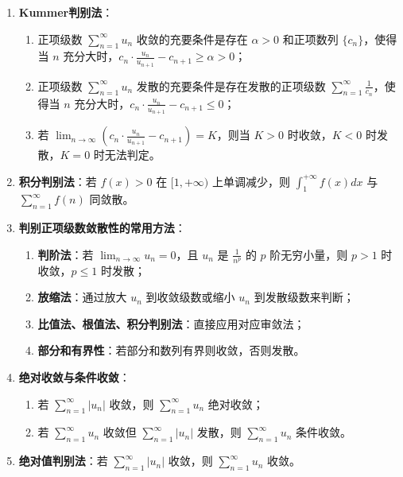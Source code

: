 \documentclass[UTF8]{ctexart}
\theoremstyle{remark}
\begin{document}
\begin{enumerate}
	\item \textbf{Kummer判别法}：
	\begin{enumerate}
		\item 正项级数 \(\sum_{n=1}^{\infty} u_n\) 收敛的充要条件是存在 \(\alpha > 0\) 和正项数列 \(\{c_n\}\)，使得当 \(n\) 充分大时，\(c_n \cdot \frac{u_n}{u_{n+1}} - c_{n+1} \geq \alpha > 0\)；
		\item 正项级数 \(\sum_{n=1}^{\infty} u_n\) 发散的充要条件是存在发散的正项级数 \(\sum_{n=1}^{\infty} \frac{1}{c_n}\)，使得当 \(n\) 充分大时，\(c_n \cdot \frac{u_n}{u_{n+1}} - c_{n+1} \leq 0\)；
		\item 若 \(\lim_{n \to \infty} \left(c_n \cdot \frac{u_n}{u_{n+1}} - c_{n+1}\right) = K\)，则当 \(K > 0\) 时收敛，\(K < 0\) 时发散，\(K = 0\) 时无法判定。
	\end{enumerate}
	
	\item \textbf{积分判别法}：若 \(f(x) > 0\) 在 \([1, +\infty)\) 上单调减少，则 \(\int_{1}^{+\infty} f(x) dx\) 与 \(\sum_{n=1}^{\infty} f(n)\) 同敛散。
	
	\item \textbf{判别正项级数敛散性的常用方法}：
	\begin{enumerate}
		\item \textbf{判阶法}：若 \(\lim_{n \to \infty} u_n = 0\)，且 \(u_n\) 是 \(\frac{1}{n^p}\) 的 \(p\) 阶无穷小量，则 \(p > 1\) 时收敛，\(p \leq 1\) 时发散；
		\item \textbf{放缩法}：通过放大 \(u_n\) 到收敛级数或缩小 \(u_n\) 到发散级数来判断；
		\item \textbf{比值法、根值法、积分判别法}：直接应用对应审敛法；
		\item \textbf{部分和有界性}：若部分和数列有界则收敛，否则发散。
	\end{enumerate}
	
	\item \textbf{绝对收敛与条件收敛}：
	\begin{enumerate}
		\item 若 \(\sum_{n=1}^{\infty} |u_n|\) 收敛，则 \(\sum_{n=1}^{\infty} u_n\) 绝对收敛；
		\item 若 \(\sum_{n=1}^{\infty} u_n\) 收敛但 \(\sum_{n=1}^{\infty} |u_n|\) 发散，则 \(\sum_{n=1}^{\infty} u_n\) 条件收敛。
	\end{enumerate}
	
	\item \textbf{绝对值判别法}：若 \(\sum_{n=1}^{\infty} |u_n|\) 收敛，则 \(\sum_{n=1}^{\infty} u_n\) 收敛。
	

\end{enumerate}
\end{document}
